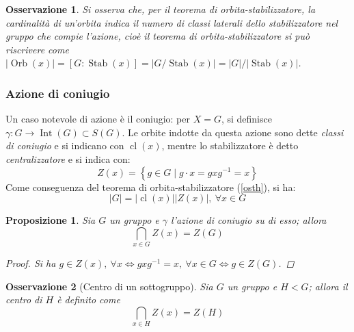 \documentclass[11pt]{scrartcl}
\theoremstyle{style1}
\newtheorem{osservazione}{Osservazione}[section]
\newtheorem{prop}{Proposizione}[section]
\numberwithin{equation}{subsection}
\begin{document}
\begin{osservazione}
Si osserva che, per il teorema di orbita-stabilizzatore, la cardinalit\`a di un'orbita indica il numero di classi laterali dello stabilizzatore nel gruppo che compie l'azione, cio\`e il teorema di orbita-stabilizzatore si pu\`o riscrivere come $\lvert \operatorname{Orb} (x) \rvert = [G: \operatorname{Stab} (x)] = \lvert G / \operatorname{Stab} (x) \rvert = \lvert G \rvert / \lvert \operatorname{Stab} (x) \rvert $.
\end{osservazione}


\subsubsection{Azione di coniugio}
 Un caso notevole di azione \`e il coniugio: per $X=G$, si definisce $\gamma : G \to \operatorname{Int} (G) \subset S(G)$.
Le orbite indotte da questa azione sono dette \textit{classi di coniugio} e si indicano con $\operatorname{cl} (x)$, mentre lo stabilizzatore \`e detto \textit{centralizzatore} e si indica con:
\begin{equation}
	Z(x) = \left\{ g \in G  \mid g \cdot x = gxg^{-1} = x \right\} 
\end{equation}
Come conseguenza del teorema di orbita-stabilizzatore (\ref{osth}), si ha:
\begin{equation}
	\lvert G \rvert  = \lvert \operatorname{cl} (x)  \rvert  \lvert Z(x) \rvert , \ \forall x \in G
\end{equation}
\begin{prop}
	Sia $G$ un gruppo e $\gamma$ l'azione di coniugio su di esso; allora
	\[
	\bigcap_{x \in G} Z(x) = Z(G)
	\] 
	\begin{proof}
		Si ha $g \in Z(x), \ \forall x \iff gxg^{-1} =x , \ \forall x \in G \iff g \in Z(G)$.
	\end{proof}
\end{prop}
\begin{osservazione}
	[Centro di un sottogruppo]
	Sia $G$ un gruppo e $H < G$; allora il centro di $H$ \`e definito come 
	\[
	\bigcap_{x \in H}  Z(x) = Z(H)
	\] 
\end{osservazione}
\end{document}
